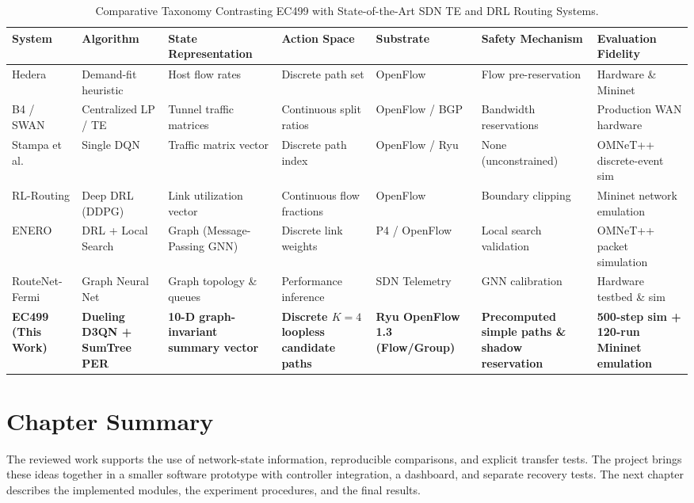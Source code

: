 \documentclass[12pt,a4paper,oneside]{report}
\let\cite\citep
\begin{document}
\begin{table}[htbp]
\centering
\caption{Comparative Taxonomy Contrasting EC499 with State-of-the-Art SDN TE and DRL Routing Systems.}
\label{tab:taxonomy}
\scriptsize
\setlength{\tabcolsep}{2.5pt}
\begin{tabularx}{\linewidth}{>{\raggedright\arraybackslash}p{1.7cm} >{\raggedright\arraybackslash}p{2.1cm} >{\raggedright\arraybackslash}X >{\raggedright\arraybackslash}p{1.6cm} >{\raggedright\arraybackslash}p{1.6cm} >{\raggedright\arraybackslash}X >{\raggedright\arraybackslash}X}
\toprule
\textbf{System} & \textbf{Algorithm} & \textbf{State Representation} & \textbf{Action Space} & \textbf{Substrate} & \textbf{Safety Mechanism} & \textbf{Evaluation Fidelity} \\
\midrule
Hedera \cite{al2010hedera} & Demand-fit heuristic & Host flow rates & Discrete path set & OpenFlow & Flow pre-reservation & Hardware \& Mininet \\
B4 / SWAN \cite{jain2013b4,hong2013achieving} & Centralized LP / TE & Tunnel traffic matrices & Continuous split ratios & OpenFlow / BGP & Bandwidth reservations & Production WAN hardware \\
Stampa et al. \cite{stampa2017deep} & Single DQN & Traffic matrix vector & Discrete path index & OpenFlow / Ryu & None (unconstrained) & OMNeT++ discrete-event sim \\
RL-Routing \cite{chen2020rlrouting} & Deep DRL (DDPG) & Link utilization vector & Continuous flow fractions & OpenFlow & Boundary clipping & Mininet network emulation \\
ENERO \cite{almasan2022enero} & DRL + Local Search & Graph (Message-Passing GNN) & Discrete link weights & P4 / OpenFlow & Local search validation & OMNeT++ packet simulation \\
RouteNet-Fermi \cite{almasan2022routenet} & Graph Neural Net & Graph topology \& queues & Performance inference & SDN Telemetry & GNN calibration & Hardware testbed \& sim \\
\midrule
\textbf{EC499 (This Work)} & \textbf{Dueling D3QN + SumTree PER} & \textbf{10-D graph-invariant summary vector} & \textbf{Discrete $K=4$ loopless candidate paths} & \textbf{Ryu OpenFlow 1.3 (Flow/Group)} & \textbf{Precomputed simple paths \& shadow reservation} & \textbf{500-step sim + 120-run Mininet emulation} \\
\bottomrule
\end{tabularx}
\end{table}

\section{Chapter Summary}
The reviewed work supports the use of network-state information, reproducible comparisons, and explicit transfer tests. The project brings these ideas together in a smaller software prototype with controller integration, a dashboard, and separate recovery tests. The next chapter describes the implemented modules, the experiment procedures, and the final results.
\end{document}
